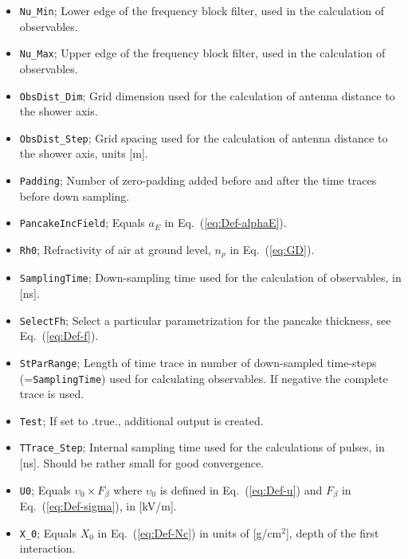 \documentclass[pdftex,dvipsnames,usenames,fleqn,12pt]{article}
\def\eqref#1{Eq.~(\ref{eq:#1})}
\begin{document}
\begin{itemize}
\item{\verb<Nu_Min<}; Lower edge of the frequency block filter, used in the calculation of observables.
\item{\verb<Nu_Max<}; Upper edge of the frequency block filter, used in the calculation of observables.

\item{\verb<ObsDist_Dim<}; Grid dimension used for the calculation of antenna distance to the shower axis.
\item{\verb<ObsDist_Step<}; Grid spacing used for the calculation of antenna distance to the shower axis, units [m].

\item{\verb<Padding<}; Number of zero-padding added before and after the time traces before down sampling.

\item{\verb<PancakeIncField<}; Equals $a_E$ in \eqref{Def-alphaE}.

\item{\verb<Rh0<}; Refractivity of air at ground level, $n_\rho$ in \eqref{GD}.

\item{\verb<SamplingTime<}; Down-sampling time used for the calculation of observables, in [ns].

\item{\verb<SelectFh<}; Select a particular parametrization for the pancake thickness, see \eqref{Def-f}.

\item{\verb<StParRange<}; Length of time trace in number of down-sampled time-steps (={\tt SamplingTime}) used for calculating observables. If negative the complete trace is used.

\item{\verb<Test<}; If set to .true., additional output is created.

\item{\verb<TTrace_Step<}; Internal sampling time used for the calculations of pulses, in [ns]. Should be rather small for good convergence.

\item{\verb<U0<}; Equals $\upsilon_0 \times F_\beta$ where $\upsilon_0$ is defined in \eqref{Def-u} and $F_\beta$ in \eqref{Def-sigma}, in [kV/m].


\item{\verb<X_0<}; Equals $X_0$ in \eqref{Def-Nc} in units of [g/cm$^2$], depth of the first interaction.


\end{itemize}
\end{document}

